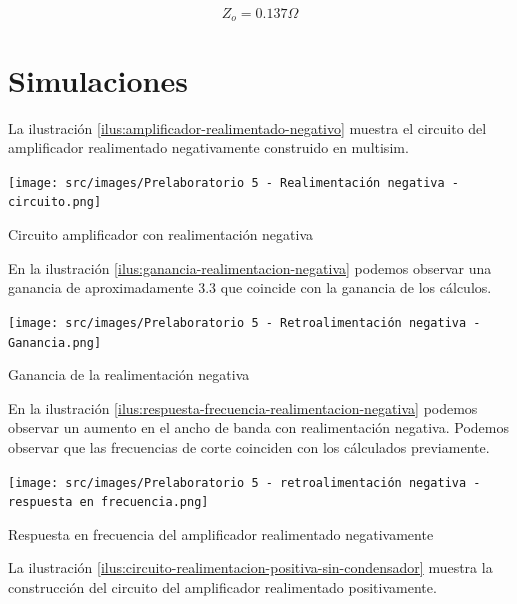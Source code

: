 \documentclass{article}
\begin{document}
$$Z_o = 0.137 \Omega$$

\section{Simulaciones}

La ilustración \ref{ilus:amplificador-realimentado-negativo} muestra el circuito del amplificador realimentado negativamente construido en multisim.

\begin{ilustracion}[ht]
    \centering
    \texttt{[image: src/images/Prelaboratorio 5 - Realimentación negativa - circuito.png]}
    \caption{Circuito amplificador con realimentación negativa}
    \label{ilus:amplificador-realimentado-negativo}
\end{ilustracion}

En la ilustración \ref{ilus:ganancia-realimentacion-negativa} podemos observar una ganancia de aproximadamente $3.3$ que coincide con la ganancia de los cálculos.

\begin{ilustracion}[ht]
    \centering
    \texttt{[image: src/images/Prelaboratorio 5 - Retroalimentación negativa - Ganancia.png]}
    \caption{Ganancia de la realimentación negativa}
    \label{ilus:ganancia-realimentacion-negativa}
\end{ilustracion}

En la ilustración \ref{ilus:respuesta-frecuencia-realimentacion-negativa} podemos observar un aumento en el ancho de banda con realimentación negativa. Podemos observar que las frecuencias de corte coinciden con los cálculados previamente.

\begin{ilustracion}[ht]
    \centering
    \texttt{[image: src/images/Prelaboratorio 5 - retroalimentación negativa - respuesta en frecuencia.png]}
    \caption{Respuesta en frecuencia del amplificador realimentado negativamente}
    \label{ilus:respuesta-frecuencia-realimentacion-negativa}
\end{ilustracion}


La ilustración \ref{ilus:circuito-realimentacion-positiva-sin-condensador} muestra la construcción del circuito del amplificador realimentado positivamente.
\end{document}
